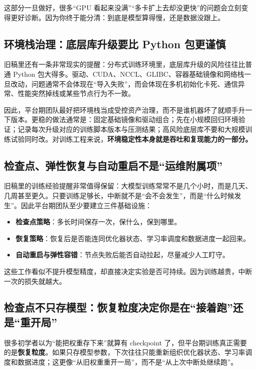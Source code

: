 这部分一旦做好，很多“GPU 看起来没满”“多卡扩上去却没更快”的问题会立刻变得更好诊断。因为你终于能分清：到底是模型算得慢，还是数据没跟上。

\subsection{环境栈治理：底层库升级要比 Python 包更谨慎}
旧稿里还有一条非常现实的提醒：分布式训练环境里，底层库升级的风险往往比普通 Python 包大得多。驱动、CUDA、NCCL、GLIBC、容器基础镜像和网络栈一旦改动，问题通常不会体现在“导入失败”，而会体现在多机初始化卡死、通信异常、性能突然掉线或某些节点行为不一致。

因此，平台期团队最好把环境栈当成受控资产治理，而不是谁机器坏了就顺手升一下版本。更稳的做法通常是：固定基础镜像和驱动组合；先在小规模回归环境验证；记录每次升级对应的训练脚本版本与压测结果；高风险底层库不要和大规模训练试验同时改。对训练工程来说，\textbf{环境稳定性本身就是吞吐和复现能力的一部分。}

\subsection{检查点、弹性恢复与自动重启不是“运维附属项”}
旧稿里的训练经验提醒非常值得保留：大模型训练常常不是几个小时，而是几天、几周甚至更久。只要训练足够长，中断就不是“会不会发生”，而是“什么时候发生”。因此平台期团队至少要建立三件基础设施：
\begin{itemize}
  \item \textbf{检查点策略}：多长时间保存一次，保什么，保到哪里。
  \item \textbf{恢复策略}：恢复后是否能连同优化器状态、学习率调度和数据进度一起回来。
  \item \textbf{自动重启与弹性容错}：节点失败后能否自动拉起，尽量减少人工盯守。
\end{itemize}

这些工作看似不提升模型精度，却直接决定实验是否可持续。因为训练越贵，中断一次的损失就越大。

\subsection{检查点不只存模型：恢复粒度决定你是在“接着跑”还是“重开局”}
很多初学者以为“能把权重存下来”就算有 checkpoint 了，但平台期训练真正需要的是\textbf{恢复粒度}。如果只存模型参数，下次往往只能重新组织优化器状态、学习率调度和数据进度；这更像“从旧权重重开一局”，而不是“从上次中断处继续跑”。

